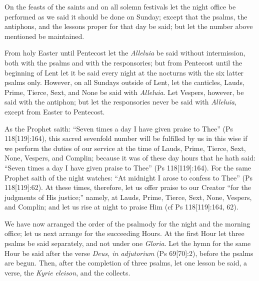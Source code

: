 
On the feasts of the saints and on all solemn festivals let the night office be performed as we said it should be done on Sunday; except that the psalms, the antiphons, and the lessons proper for that day be said; but let the number above mentioned be maintained.


From holy Easter until Pentecost let the \emph{Alleluia} be said without intermission, both with the psalms and with the responsories; but from Pentecost until the beginning of Lent let it be said every night at the nocturns with the six latter psalms only. However, on all Sundays outside of Lent, let the canticles, Lauds, Prime, Tierce, Sext, and None be said with \emph{Alleluia}. Let Vespers, however, be said with the antiphon; but let the responsories never be said with \emph{Alleluia}, except from Easter to Pentecost.


As the Prophet saith: ``Seven times a day I have given praise to Thee'' (Ps 118[119]:164), this sacred sevenfold number will be fulfilled by us in this wise if we perform the duties of our service at the time of Lauds, Prime, Tierce, Sext, None, Vespers, and Complin; because it was of these day hours that he hath said: ``Seven times a day I have given praise to Thee'' (Ps 118[119]:164). For the same Prophet saith of the night watches: ``At midnight I arose to confess to Thee'' (Ps 118[119]:62). At these times, therefore, let us offer praise to our Creator ``for the judgments of His justice;'' namely, at Lauds, Prime, Tierce, Sext, None, Vespers, and Complin; and let us rise at night to praise Him (cf Ps 118[119]:164, 62).


We have now arranged the order of the psalmody for the night and the morning office; let us next arrange for the succeeding Hours. At the first Hour let three psalms be said separately, and not under one \emph{Gloria}. Let the hymn for the same Hour be said after the verse \emph{Deus, in adjutorium} (Ps 69[70]:2), before the psalms are begun. Then, after the completion of three psalms, let one lesson be said, a verse, the \emph{Kyrie eleison}, and the collects.


